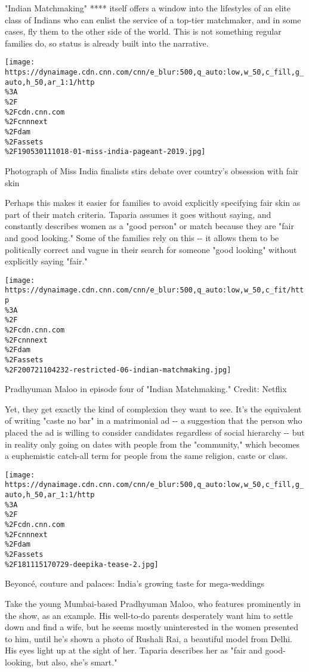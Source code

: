 "Indian Matchmaking" **** itself offers a window into the lifestyles of
an elite class of Indians who can enlist the service of a top-tier
matchmaker, and in some cases, fly them to the other side of the world.
This is not something regular families do, so status is already built
into the narrative.

\href{/style/article/miss-india-fairness-intl/index.html}{}

\texttt{[image: https://dynaimage.cdn.cnn.com/cnn/e\_blur:500,q\_auto:low,w\_50,c\_fill,g\_auto,h\_50,ar\_1:1/http\\\%3A\\\%2F\\\%2Fcdn.cnn.com\\\%2Fcnnnext\\\%2Fdam\\\%2Fassets\\\%2F190530111018-01-miss-india-pageant-2019.jpg]}

Photograph of Miss India finalists stirs debate over country's obsession
with fair skin

Perhaps this makes it easier for families to avoid explicitly specifying
fair skin as part of their match criteria. Taparia assumes it goes
without saying, and constantly describes women as a "good person" or
match because they are "fair and good looking." Some of the families
rely on this -\/- it allows them to be politically correct and vague in
their search for someone "good looking" without explicitly saying
"fair."

\texttt{[image: https://dynaimage.cdn.cnn.com/cnn/e\_blur:500,q\_auto:low,w\_50,c\_fit/http\\\%3A\\\%2F\\\%2Fcdn.cnn.com\\\%2Fcnnnext\\\%2Fdam\\\%2Fassets\\\%2F200721104232-restricted-06-indian-matchmaking.jpg]}

Pradhyuman Maloo in episode four of "Indian Matchmaking." Credit:
Netflix

Yet, they get exactly the kind of complexion they want to see. It's the
equivalent of writing "caste no bar" in a matrimonial ad -\/- a
suggestion that the person who placed the ad is willing to consider
candidates regardless of social hierarchy -\/- but in reality only going
on dates with people from the "community," which becomes a euphemistic
catch-all term for people from the same religion, caste or class.

\href{/style/article/india-wedding-culture/index.html}{}

\texttt{[image: https://dynaimage.cdn.cnn.com/cnn/e\_blur:500,q\_auto:low,w\_50,c\_fill,g\_auto,h\_50,ar\_1:1/http\\\%3A\\\%2F\\\%2Fcdn.cnn.com\\\%2Fcnnnext\\\%2Fdam\\\%2Fassets\\\%2F181115170729-deepika-tease-2.jpg]}

Beyoncé, couture and palaces: India's growing taste for mega-weddings

Take the young Mumbai-based Pradhyuman Maloo, who features prominently
in the show, as an example. His well-to-do parents desperately want him
to settle down and find a wife, but he seems mostly uninterested in the
women presented to him, until he's shown a photo of Rushali Rai, a
beautiful model from Delhi. His eyes light up at the sight of her.
Taparia describes her as "fair and good-looking, but also, she's smart."

